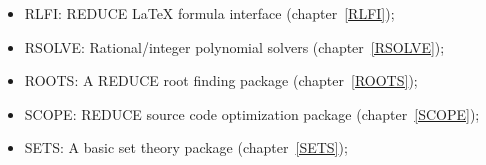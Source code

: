 \begin{itemize}
\item
{RLFI: REDUCE LaTeX formula interface} (chapter~\ref{RLFI});

\item
{RSOLVE: Rational/integer polynomial solvers} (chapter~\ref{RSOLVE});

\item
{ROOTS: A REDUCE root finding package} (chapter~\ref{ROOTS});

\item
{SCOPE: REDUCE source code optimization package}
(chapter~\ref{SCOPE}); 

\item
{SETS: A basic set theory package} (chapter~\ref{SETS});


\end{itemize}
